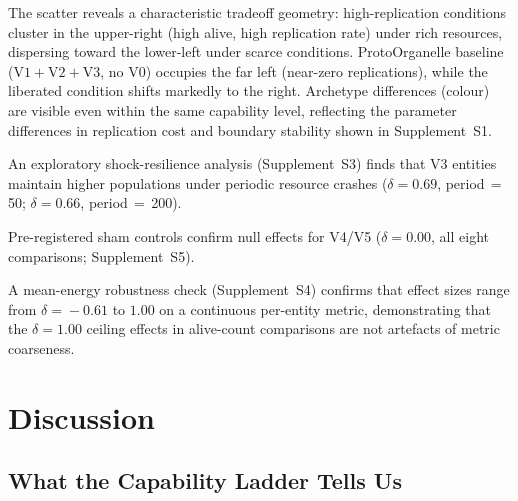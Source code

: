 \documentclass[letterpaper]{article}
\begin{document}
The scatter reveals a characteristic tradeoff geometry: high-replication
conditions cluster in the upper-right (high alive, high replication rate)
under rich resources, dispersing toward the lower-left under scarce conditions.
ProtoOrganelle baseline ($\mathrm{V1+V2+V3}$, no V0) occupies the far left
(near-zero replications), while the liberated condition shifts markedly to
the right.
Archetype differences (colour) are visible even within the same capability
level, reflecting the parameter differences in replication cost and boundary
stability shown in Supplement~S1.

An exploratory shock-resilience analysis (Supplement~S3) finds that V3
entities maintain higher populations under periodic resource crashes
($\delta\!=\!0.69$, period$\,{=}\,$50; $\delta\!=\!0.66$, period$\,{=}\,$200).

Pre-registered sham controls confirm null effects for V4/V5
($\delta\!=\!0.00$, all eight comparisons; Supplement~S5).

A mean-energy robustness check (Supplement~S4) confirms that effect sizes
range from $\delta\!=\!{-}0.61$ to $1.00$ on a continuous per-entity metric,
demonstrating that the $\delta\!=\!1.00$ ceiling effects in alive-count
comparisons are not artefacts of metric coarseness.

\section{Discussion}
\label{sec:discussion}

\subsection{What the Capability Ladder Tells Us}
\end{document}
